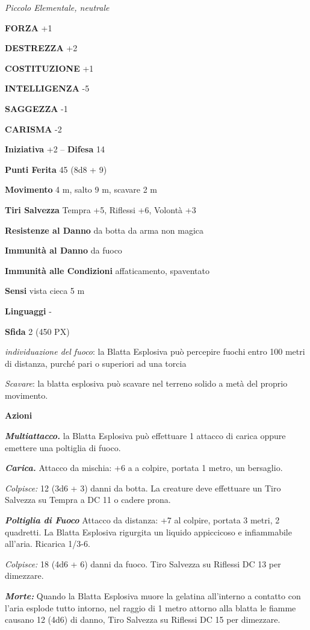 \begin{multicols}{2}
\textit{Piccolo Elementale, neutrale}

\textbf{FORZA} +1

\textbf{DESTREZZA} +2

\textbf{COSTITUZIONE} +1

\textbf{INTELLIGENZA} -5

\textbf{SAGGEZZA} -1

\textbf{CARISMA} -2

\textbf{Iniziativa} +2 -- \textbf{Difesa} 14

\textbf{Punti Ferita} 45 (8d8 + 9)

\textbf{Movimento} 4 m, salto 9 m, scavare 2 m

\textbf{Tiri Salvezza} Tempra +5, Riflessi +6, Volontà +3

\textbf{Resistenze al Danno} da botta da arma non magica

\textbf{Immunità al Danno} da fuoco

\textbf{Immunità alle Condizioni} affaticamento, spaventato

\textbf{Sensi} vista cieca 5 m

\textbf{Linguaggi} -

\textbf{Sfida} 2 (450 PX)

\textit{individuazione del fuoco}: la Blatta Esplosiva può percepire fuochi entro 100 metri di distanza, purché pari o superiori ad una torcia

\textit{Scavare}: la blatta esplosiva può scavare nel terreno solido a metà del proprio movimento.

\textbf{Azioni}

\textit{\textbf{Multiattacco.}} la Blatta Esplosiva può effettuare 1 attacco di carica oppure emettere una poltiglia di fuoco.

\textit{\textbf{Carica.}} Attacco da mischia: +6 a a colpire, portata 1 metro, un bersaglio.

\textit{Colpisce:} 12 (3d6 + 3) danni da botta. La creature deve effettuare un Tiro Salvezza su Tempra a DC 11 o cadere prona.

\textit{\textbf{Poltiglia di Fuoco}} Attacco da distanza: +7 al colpire, portata 3 metri, 2 quadretti. La Blatta Esplosiva rigurgita un liquido appiccicoso e infiammabile all'aria. Ricarica 1/3-6.

\textit{Colpisce:} 18 (4d6 + 6) danni da fuoco. Tiro Salvezza su Riflessi DC 13 per dimezzare.

\textit{\textbf{Morte:}} Quando la Blatta Esplosiva muore la gelatina all'interno a contatto con l'aria esplode tutto intorno, nel raggio di 1 metro attorno alla blatta le fiamme causano 12 (4d6) di danno, Tiro Salvezza su Riflessi DC 15 per dimezzare.


\end{multicols}
